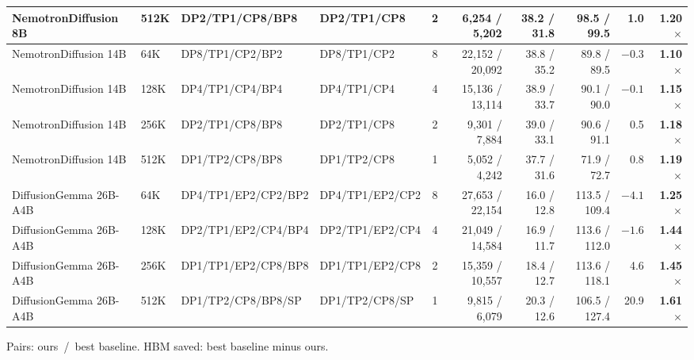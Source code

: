 \begin{table}[H]
{\begin{tabular}{@{}llllcrrrrr@{}}
    NemotronDiffusion 8B & 512K & DP2/TP1/CP8/BP8 & DP2/TP1/CP8 & 2  & 6{,}254 / 5{,}202 & 38.2 / 31.8 & 98.5 / 99.5 & 1.0 & \textbf{1.20$\times$} \\
    \midrule
    NemotronDiffusion 14B & 64K  & DP8/TP1/CP2/BP2 & DP8/TP1/CP2 & 8 & 22{,}152 / 20{,}092 & 38.8 / 35.2 & 89.8 / 89.5 & $-0.3$ & \textbf{1.10$\times$} \\
    NemotronDiffusion 14B & 128K & DP4/TP1/CP4/BP4 & DP4/TP1/CP4 & 4 & 15{,}136 / 13{,}114 & 38.9 / 33.7 & 90.1 / 90.0 & $-0.1$ & \textbf{1.15$\times$} \\
    NemotronDiffusion 14B & 256K & DP2/TP1/CP8/BP8 & DP2/TP1/CP8 & 2 & 9{,}301 / 7{,}884 & 39.0 / 33.1 & 90.6 / 91.1 & 0.5 & \textbf{1.18$\times$} \\
    NemotronDiffusion 14B & 512K & DP1/TP2/CP8/BP8 & DP1/TP2/CP8 & 1 & 5{,}052 / 4{,}242 & 37.7 / 31.6 & 71.9 / 72.7 & 0.8 & \textbf{1.19$\times$} \\
    \midrule
    DiffusionGemma 26B-A4B & 64K  & DP4/TP1/EP2/CP2/BP2 & DP4/TP1/EP2/CP2 & 8 & 27{,}653 / 22{,}154 & 16.0 / 12.8 & 113.5 / 109.4 & $-4.1$ & \textbf{1.25$\times$} \\
    DiffusionGemma 26B-A4B & 128K & DP2/TP1/EP2/CP4/BP4 & DP2/TP1/EP2/CP4 & 4 & 21{,}049 / 14{,}584 & 16.9 / 11.7 & 113.6 / 112.0 & $-1.6$ & \textbf{1.44$\times$} \\
    DiffusionGemma 26B-A4B & 256K & DP1/TP1/EP2/CP8/BP8 & DP1/TP1/EP2/CP8 & 2 & 15{,}359 / 10{,}557 & 18.4 / 12.7 & 113.6 / 118.1 & 4.6 & \textbf{1.45$\times$} \\
    DiffusionGemma 26B-A4B & 512K & DP1/TP2/CP8/BP8/SP & DP1/TP2/CP8/SP & 1 & 9{,}815 / 6{,}079 & 20.3 / 12.6 & 106.5 / 127.4 & 20.9 & \textbf{1.61$\times$} \\
    \bottomrule
  \end{tabular}}
  \par\vspace{2pt}
  \parbox{\linewidth}{\footnotesize\raggedright Pairs: ours~/~best baseline. HBM saved: best baseline minus ours.}
\end{table}
